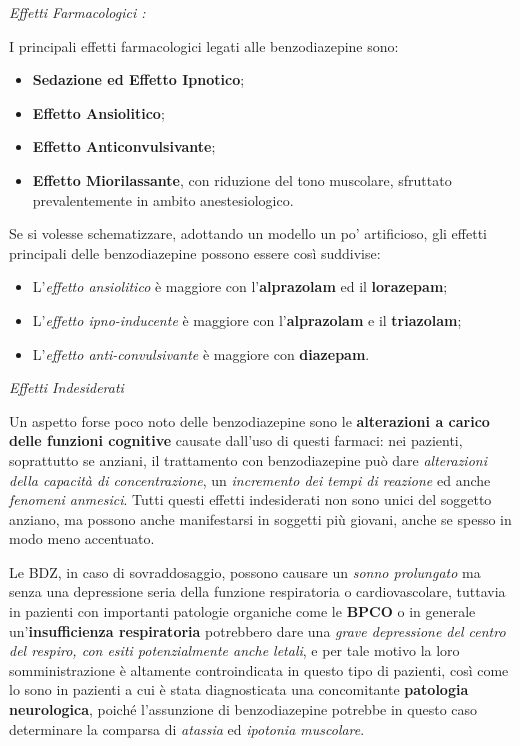 \documentclass[]{article}
\begin{document}
\emph{\emph{Effetti Farmacologici :}}

I principali effetti farmacologici legati alle benzodiazepine sono:

\begin{itemize}
\item
  \textbf{Sedazione ed Effetto Ipnotico};
\item
  \textbf{Effetto Ansiolitico};
\item
  \textbf{Effetto Anticonvulsivante};
\item
  \textbf{Effetto Miorilassante}, con riduzione del tono muscolare,
  sfruttato prevalentemente in ambito anestesiologico.
\end{itemize}

Se si volesse schematizzare, adottando un modello un po' artificioso,
gli effetti principali delle benzodiazepine possono essere così
suddivise:

\begin{itemize}
\item
  L'\emph{effetto ansiolitico} è maggiore con l'\textbf{alprazolam} ed
  il \textbf{lorazepam};
\item
  L'\emph{effetto ipno-inducente} è maggiore con l'\textbf{alprazolam} e
  il \textbf{triazolam};
\item
  L'\emph{effetto anti-convulsivante} è maggiore con \textbf{diazepam}.
\end{itemize}

\emph{\emph{Effetti Indesiderati}}

Un aspetto forse poco noto delle benzodiazepine sono le
\textbf{alterazioni a carico delle funzioni cognitive} causate dall'uso
di questi farmaci: nei pazienti, soprattutto se anziani, il trattamento
con benzodiazepine può dare \emph{alterazioni della capacità di
concentrazione}, un \emph{incremento dei tempi di reazione} ed anche
\emph{fenomeni anmesici}. Tutti questi effetti indesiderati non sono
unici del soggetto anziano, ma possono anche manifestarsi in soggetti
più giovani, anche se spesso in modo meno accentuato.

Le BDZ, in caso di sovraddosaggio, possono causare un \emph{sonno
prolungato} ma senza una depressione seria della funzione respiratoria o
cardiovascolare, tuttavia in pazienti con importanti patologie organiche
come le \textbf{BPCO} o in generale un'\textbf{insufficienza
respiratoria} potrebbero dare una \emph{grave depressione del centro del
respiro, con esiti potenzialmente anche letali}, e per tale motivo la
loro somministrazione è altamente controindicata in questo tipo di
pazienti, così come lo sono in pazienti a cui è stata diagnosticata una
concomitante \textbf{patologia neurologica}, poiché l'assunzione di
benzodiazepine potrebbe in questo caso determinare la comparsa di
\emph{atassia} ed \emph{ipotonia muscolare}.
\end{document}
